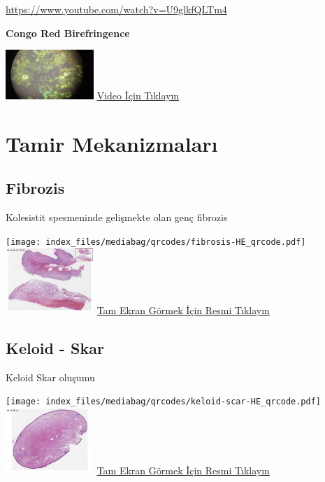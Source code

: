 \documentclass[
  letterpaper,
  DIV=11,
  numbers=noendperiod]{scrreprt}
\begin{document}
\url{https://www.youtube.com/watch?v=U9glkfQLTm4}

\textbf{Congo Red Birefringence}

\href{https://www.youtube.com/watch?v=U9glkfQLTm4}{\includegraphics[width=0.25\textwidth,height=\textheight]{./screenshots/thumbnail_congored_video.png}}
\href{https://www.youtube.com/watch?v=U9glkfQLTm4}{Video İçin Tıklayın}

\chapter{Tamir Mekanizmaları}\label{sec-tamir-mekanizmalari}

\section{Fibrozis}\label{sec-fibrozis}

Kolesistit spesmeninde gelişmekte olan genç fibrozis

\texttt{[image: index\_files/mediabag/qrcodes/fibrosis-HE\_qrcode.pdf]}
\href{https://images.patolojiatlasi.com/fibrosis/HE.html}{\includegraphics[width=0.25\textwidth,height=\textheight]{./screenshots/thumbnail_fibrosis.png}}
\href{https://images.patolojiatlasi.com/fibrosis/HE.html}{Tam Ekran
Görmek İçin Resmi Tıklayın}

\section{Keloid - Skar}\label{sec-keloid-skar}

Keloid Skar oluşumu

\texttt{[image: index\_files/mediabag/qrcodes/keloid-scar-HE\_qrcode.pdf]}
\href{https://images.patolojiatlasi.com/keloid-scar/HE.html}{\includegraphics[width=0.25\textwidth,height=\textheight]{./screenshots/thumbnail_keloid-scar.png}}
\href{https://images.patolojiatlasi.com/keloid-scar/HE.html}{Tam Ekran
Görmek İçin Resmi Tıklayın}
\end{document}
